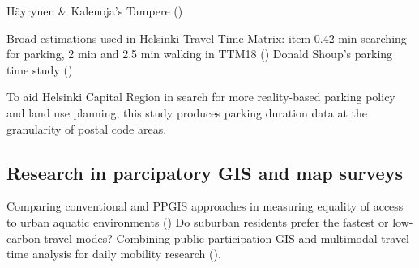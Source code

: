 Häyrynen \& Kalenoja's Tampere (\cite{Kalenoja2003})
\item Broad estimations used in Helsinki Travel Time Matrix: item 0.42 min searching for parking, 2 min and 2.5 min walking in TTM18 (\cite{Tenkanen2020})
Donald Shoup's parking time study (\cite{Shoup2006})

To aid Helsinki Capital Region in search for more reality-based parking policy and land use planning, this study produces parking duration data at the granularity of postal code areas.

\newpage
\subsection{Research in parcipatory GIS and map surveys}
\justify
Comparing conventional and PPGIS approaches in measuring equality of access to urban aquatic environments (\cite{Laatikainen2015})
Do suburban residents prefer the fastest or low-carbon travel modes? Combining public participation GIS and multimodal travel time analysis for daily mobility research (\cite{Salonen2014}).